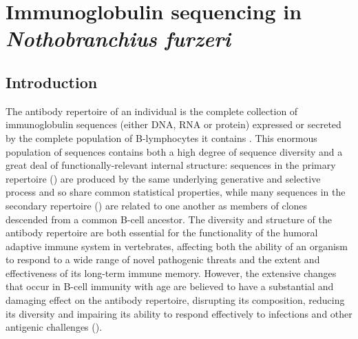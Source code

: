 \chapter{Immunoglobulin sequencing in \textit{Nothobranchius furzeri}} 
\label{chap:igseq} 
\onehalfspacing

\pagebreak

\section{Introduction}
\label{sec:igseq_intro}

The antibody repertoire of an individual is the complete collection of immunoglobulin sequences (either DNA, RNA or protein) expressed or secreted by the complete population of B-lymphocytes it contains \parencite{miho2018computational}. This enormous population of sequences contains both a high degree of sequence diversity and a great deal of functionally-relevant internal structure: \naive sequences in the primary repertoire () are produced by the same underlying generative and selective process and so share common statistical properties, while many sequences in the secondary repertoire () are related to one another as members of clones descended from a common \naive B-cell ancestor. The diversity and structure of the antibody repertoire are both essential for the functionality of the humoral adaptive immune system in vertebrates, affecting both the ability of an organism to respond to a wide range of novel pathogenic threats and the extent and effectiveness of its long-term immune memory. However, the extensive changes that occur in B-cell immunity with age are believed to have a substantial and damaging effect on the antibody repertoire, disrupting its composition, reducing its diversity and impairing its ability to respond effectively to infections and other antigenic challenges ().

